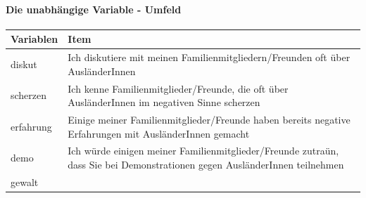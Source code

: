 \documentclass[]{article}
\let\oldparagraph\paragraph
\renewcommand{\paragraph}[1]{\oldparagraph{#1}\mbox{}}
\begin{document}
\paragraph{Die unabhängige Variable -
Umfeld}\label{die-unabhangige-variable---umfeld}

\begin{longtable}[]{@{}ll@{}}
\toprule
\begin{minipage}[b]{0.09\columnwidth}\raggedright\strut
Variablen\strut
\end{minipage} & \begin{minipage}[b]{0.85\columnwidth}\raggedright\strut
Item\strut
\end{minipage}\tabularnewline
\midrule
\endhead
\begin{minipage}[t]{0.09\columnwidth}\raggedright\strut
diskut\strut
\end{minipage} & \begin{minipage}[t]{0.85\columnwidth}\raggedright\strut
Ich diskutiere mit meinen Familienmitgliedern/Freunden oft über
AusländerInnen\strut
\end{minipage}\tabularnewline
\begin{minipage}[t]{0.09\columnwidth}\raggedright\strut
scherzen\strut
\end{minipage} & \begin{minipage}[t]{0.85\columnwidth}\raggedright\strut
Ich kenne Familienmitglieder/Freunde, die oft über AusländerInnen im
negativen Sinne scherzen\strut
\end{minipage}\tabularnewline
\begin{minipage}[t]{0.09\columnwidth}\raggedright\strut
erfahrung\strut
\end{minipage} & \begin{minipage}[t]{0.85\columnwidth}\raggedright\strut
Einige meiner Familienmitglieder/Freunde haben bereits negative
Erfahrungen mit AusländerInnen gemacht\strut
\end{minipage}\tabularnewline
\begin{minipage}[t]{0.09\columnwidth}\raggedright\strut
demo\strut
\end{minipage} & \begin{minipage}[t]{0.85\columnwidth}\raggedright\strut
Ich würde einigen meiner Familienmitglieder/Freunde zutraün, dass Sie
bei Demonstrationen gegen AusländerInnen teilnehmen\strut
\end{minipage}\tabularnewline
\begin{minipage}[t]{0.09\columnwidth}\raggedright\strut
gewalt\strut
\end{minipage} & \begin{minipage}[t]{0.85\columnwidth}\raggedright\strut

\end{minipage}
\end{longtable}
\end{document}
